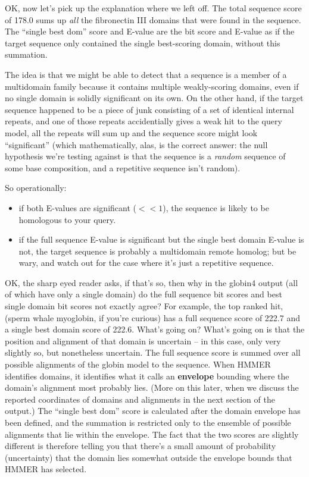 OK, now let's pick up the explanation where we left off. The total
sequence score of 178.0 sums up \emph{all} the fibronectin III domains
that were found in the  sequence. The ``single best
dom'' score and E-value are the bit score and E-value as if the target
sequence only contained the single best-scoring domain, without this
summation.

The idea is that we might be able to detect that a sequence is a
member of a multidomain family because it contains multiple
weakly-scoring domains, even if no single domain is solidly
significant on its own.  On the other hand, if the target sequence
happened to be a piece of junk consisting of a set of identical
internal repeats, and one of those repeats accidentially gives a weak
hit to the query model, all the repeats will sum up and the sequence
score might look ``significant'' (which mathematically, alas, is the
correct answer: the null hypothesis we're testing against is that the
sequence is a \emph{random} sequence of some base composition, and a
repetitive sequence isn't random).

So operationally:
\begin{itemize}
\item if both E-values are significant ($<<1$), the sequence is likely
      to be homologous to your query.
\item if the full sequence E-value is significant but the single best domain
      E-value is not, the target sequence is probably a multidomain remote 
      homolog; but be wary, and watch out for the case where it's just a repetitive
      sequence.
\end{itemize}

OK, the sharp eyed reader asks, if that's so, then why in the globin4
output (all of which have only a single domain) do the full sequence
bit scores and best single domain bit scores not exactly agree? For
example, the top ranked hit,  (sperm whale myoglobin,
if you're curious) has a full sequence score of 222.7 and a single
best domain score of 222.6. What's going on? What's going on is that
the position and alignment of that domain is uncertain -- in this
case, only very slightly so, but nonetheless uncertain. The full
sequence score is summed over all possible alignments of the globin
model to the  sequence. When HMMER identifies
domains, it identifies what it calls an \textbf{envelope} bounding
where the domain's alignment most probably lies. (More on this later,
when we discuss the reported coordinates of domains and alignments in
the next section of the output.) The ``single best dom'' score is
calculated after the domain envelope has been defined, and the
summation is restricted only to the ensemble of possible alignments
that lie within the envelope. The fact that the two scores are
slightly different is therefore telling you that there's a small
amount of probability (uncertainty) that the domain lies somewhat
outside the envelope bounds that HMMER has selected.


